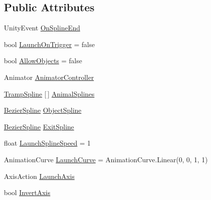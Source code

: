 \subsection*{Public Attributes}
\begin{DoxyCompactItemize}
\item 
Unity\+Event \mbox{\hyperlink{class_trampoline_a4a2450bd36816b5fa007622413b2bf33}{On\+Spline\+End}}
\item 
bool \mbox{\hyperlink{class_trampoline_a51524749c9009590b8585f711e4c5064}{Launch\+On\+Trigger}} = false
\item 
bool \mbox{\hyperlink{class_trampoline_a7b13a227faf77c125abec786dd7d8e9c}{Allow\+Objects}} = false
\item 
Animator \mbox{\hyperlink{class_trampoline_aa9187792ca436af65cca3180da945c8b}{Animator\+Controller}}
\item 
\mbox{\hyperlink{class_trampoline_1_1_tramp_spline}{Tramp\+Spline}} \mbox{[}$\,$\mbox{]} \mbox{\hyperlink{class_trampoline_abe1760bab2cdc68d0e77d44c952879fa}{Animal\+Splines}}
\item 
\mbox{\hyperlink{class_bezier_spline}{Bezier\+Spline}} \mbox{\hyperlink{class_trampoline_a58599e3ada17e6bb98ef27fa7afa0b47}{Object\+Spline}}
\item 
\mbox{\hyperlink{class_bezier_spline}{Bezier\+Spline}} \mbox{\hyperlink{class_trampoline_aea8073d79b9f7ba4a0ffd874d75ff0b3}{Exit\+Spline}}
\item 
float \mbox{\hyperlink{class_trampoline_a7bd13ae4229933df0648f5a714bce5aa}{Launch\+Spline\+Speed}} = 1
\item 
Animation\+Curve \mbox{\hyperlink{class_trampoline_ac0d0e4d0f6f1e52ac36235c4a35dd28d}{Launch\+Curve}} = Animation\+Curve.\+Linear(0, 0, 1, 1)
\item 
Axis\+Action \mbox{\hyperlink{class_trampoline_ac7db8dd743a2cfbf7224d611eef4bad2}{Launch\+Axis}}
\item 
bool \mbox{\hyperlink{class_trampoline_ae47591befb521f0821ad4caae5edd492}{Invert\+Axis}}
\end{DoxyCompactItemize}
